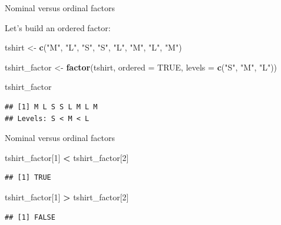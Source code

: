 \documentclass[ignorenonframetext,]{beamer}
\newenvironment{Shaded}{\begin{snugshade}}{\end{snugshade}}
\newcommand{\DataTypeTok}[1]{\textcolor[rgb]{0.13,0.29,0.53}{#1}}
\newcommand{\DecValTok}[1]{\textcolor[rgb]{0.00,0.00,0.81}{#1}}
\newcommand{\KeywordTok}[1]{\textcolor[rgb]{0.13,0.29,0.53}{\textbf{#1}}}
\newcommand{\NormalTok}[1]{#1}
\newcommand{\OperatorTok}[1]{\textcolor[rgb]{0.81,0.36,0.00}{\textbf{#1}}}
\newcommand{\OtherTok}[1]{\textcolor[rgb]{0.56,0.35,0.01}{#1}}
\newcommand{\StringTok}[1]{\textcolor[rgb]{0.31,0.60,0.02}{#1}}
\begin{document}
\begin{frame}[fragile]{Nominal versus ordinal factors}
\protect\hypertarget{nominal-versus-ordinal-factors-1}{}

Let's build an ordered factor:

\begin{Shaded}
\begin{Highlighting}[]
\NormalTok{tshirt <-}\StringTok{ }\KeywordTok{c}\NormalTok{(}\StringTok{"M"}\NormalTok{, }\StringTok{"L"}\NormalTok{, }\StringTok{"S"}\NormalTok{, }\StringTok{"S"}\NormalTok{, }\StringTok{"L"}\NormalTok{, }\StringTok{"M"}\NormalTok{, }\StringTok{"L"}\NormalTok{, }\StringTok{"M"}\NormalTok{)}

\NormalTok{tshirt_factor <-}\StringTok{ }\KeywordTok{factor}\NormalTok{(tshirt, }
                        \DataTypeTok{ordered =} \OtherTok{TRUE}\NormalTok{, }
                        \DataTypeTok{levels =} \KeywordTok{c}\NormalTok{(}\StringTok{"S"}\NormalTok{, }\StringTok{"M"}\NormalTok{, }\StringTok{"L"}\NormalTok{))}

\NormalTok{tshirt_factor}
\end{Highlighting}
\end{Shaded}

\begin{verbatim}
## [1] M L S S L M L M
## Levels: S < M < L
\end{verbatim}

\end{frame}

\begin{frame}[fragile]{Nominal versus ordinal factors}
\protect\hypertarget{nominal-versus-ordinal-factors-2}{}

\begin{Shaded}
\begin{Highlighting}[]
\NormalTok{tshirt_factor[}\DecValTok{1}\NormalTok{] }\OperatorTok{<}\StringTok{ }\NormalTok{tshirt_factor[}\DecValTok{2}\NormalTok{]}
\end{Highlighting}
\end{Shaded}

\begin{verbatim}
## [1] TRUE
\end{verbatim}

\begin{Shaded}
\begin{Highlighting}[]
\NormalTok{tshirt_factor[}\DecValTok{1}\NormalTok{] }\OperatorTok{>}\StringTok{ }\NormalTok{tshirt_factor[}\DecValTok{2}\NormalTok{]}
\end{Highlighting}
\end{Shaded}

\begin{verbatim}
## [1] FALSE
\end{verbatim}

\end{frame}
\end{document}
